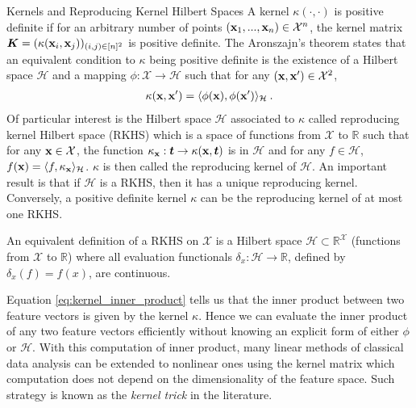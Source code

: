\begin{mem1}{Kernels and Reproducing Kernel Hilbert Spaces}\label{rem:kernels}
	A kernel $\kappa(\cdot, \cdot)$ is positive definite if for an arbitrary number of points $({\mathbf{x}}_1, ..., {\mathbf{x}}_n) \in \mathcal{X}^n$, the kernel matrix $\bm{K} = (\kappa({\mathbf{x}}_i, {\mathbf{x}}_j))_{(i,j) \in [n]^2}$ is positive definite. The Aronszajn's theorem \citep{aronszajn1950theory} states that an equivalent condition to $\kappa$ being positive definite is the existence of a Hilbert space $\mathcal{H}$ and a mapping $\phi : \mathcal{X} \to \mathcal{H}$ such that for any $({\mathbf{x}}, {\mathbf{x}}') \in \mathcal{X}^2$,
\begin{align}\label{eq:kernel_inner_product}
    \kappa({\mathbf{x}}, {\mathbf{x}}') = \langle \phi({\mathbf{x}}), \phi({\mathbf{x}}') \rangle_{\mathcal{H}} \:.
\end{align}
Of particular interest is the Hilbert space $\mathcal{H}$ associated to $\kappa$ called reproducing kernel Hilbert space (RKHS) which is a space of functions from $\mathcal{X}$ to $\mathbb{R}$ such that for any ${\mathbf{x}} \in \mathcal{X}$, the function $\kappa_{{\mathbf{x}}} : \bm{t} \to \kappa({\mathbf{x}}, \bm{t})$ is in $\mathcal{H}$ and for any $f \in \mathcal{H}$, $f({\mathbf{x}}) = \langle f, \kappa_{{\mathbf{x}}} \rangle_{\mathcal{H}}$. $\kappa$ is then called the reproducing kernel of $\mathcal{H}$. An important result is that if $\mathcal{H}$ is a RKHS, then it has a unique reproducing kernel. Conversely, a positive definite kernel $\kappa$ can be the reproducing kernel of at most one RKHS.

An equivalent definition of a RKHS on $\mathcal{X}$ is a Hilbert
space $\mathcal{H} \subset \mathbb{R}^{\mathcal{X}}$ (functions from $\mathcal{X}$ to $\mathbb{R}$) where all evaluation functionals $\delta_x : \mathcal{H} \to \mathbb{R}$,
defined by $\delta_x(f) = f(x)$, are continuous.

Equation \ref{eq:kernel_inner_product} tells us that the inner product between two feature vectors is given by the kernel $\kappa$. Hence we can evaluate the inner product of any two feature vectors efficiently without knowing an explicit form of either $\phi$ or $\mathcal{H}$. With this computation of inner product, many linear methods of classical data analysis can be extended to nonlinear ones using the kernel matrix which computation does not depend on the dimensionality of the feature space. Such strategy is known as the \textit{kernel trick} in the literature.
\end{mem1}


